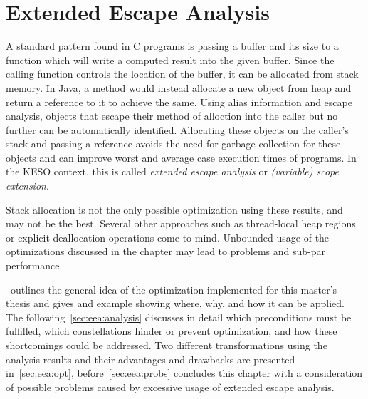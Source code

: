 
\chapter{Extended Escape Analysis}
	\label{chapter:eea}
	A standard pattern found in C programs is passing a buffer and its size to a function which will write a computed
	result into the given buffer. Since the calling function controls the location of the buffer, it can be allocated from
	stack memory. In Java, a method would instead allocate a new object from heap and return a reference to it to achieve
	the same. Using alias information and escape analysis, objects that escape their method of alloction into the caller
	but no further can be automatically identified. Allocating these objects on the caller's stack and passing a reference
	avoids the need for garbage collection for these objects and can improve worst and average case execution times of
	programs. In the KESO context, this is called \emph{extended escape analysis} or \emph{(variable) scope extension}.

	Stack allocation is not the only possible optimization using these results, and may not be the best. Several other
	approaches such as thread-local heap regions or explicit deallocation operations come to mind. Unbounded usage of the
	optimizations discussed in the chapter may lead to problems and sub-par performance.

	~outlines the general idea of the optimization implemented for this master's thesis and gives and
	example showing where, why, and how it can be applied. The following~\cref{sec:eea:analysis} discusses in detail which
	preconditions must be fulfilled, which constellations hinder or prevent optimization, and how these shortcomings could
	be addressed. Two different transformations using the analysis results and their advantages and drawbacks are
	presented in~\cref{sec:eea:opt}, before~\cref{sec:eea:probs} concludes this chapter with a consideration of possible
	problems caused by excessive usage of extended escape analysis.

